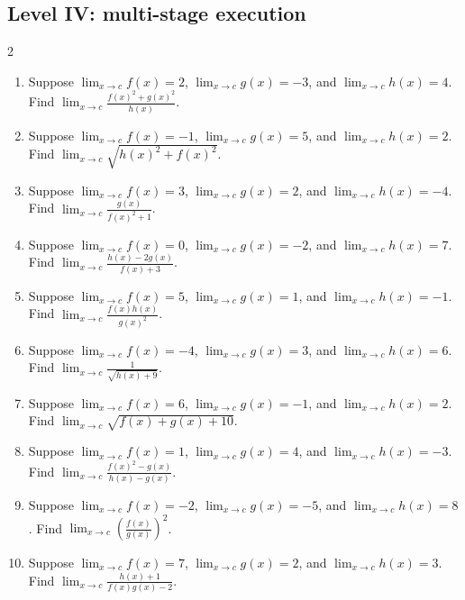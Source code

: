 \documentclass[11pt,oneside]{book}
\begin{document}
\subsection*{Level IV: multi-stage execution}
\begin{multicols}{2}
\begin{enumerate}[leftmargin=*,label=\textbf{\arabic*.},itemsep=0.65\baselineskip]
\item Suppose $\lim_{x\to c} f(x)=2$, $\lim_{x\to c} g(x)=-3$, and $\lim_{x\to c} h(x)=4$. Find $\displaystyle\lim_{x\to c} \frac{f(x)^2+g(x)^2}{h(x)}$.
\item Suppose $\lim_{x\to c} f(x)=-1$, $\lim_{x\to c} g(x)=5$, and $\lim_{x\to c} h(x)=2$. Find $\displaystyle\lim_{x\to c} \sqrt{h(x)^2+f(x)^2}$.
\item Suppose $\lim_{x\to c} f(x)=3$, $\lim_{x\to c} g(x)=2$, and $\lim_{x\to c} h(x)=-4$. Find $\displaystyle\lim_{x\to c} \frac{g(x)}{f(x)^2+1}$.
\item Suppose $\lim_{x\to c} f(x)=0$, $\lim_{x\to c} g(x)=-2$, and $\lim_{x\to c} h(x)=7$. Find $\displaystyle\lim_{x\to c} \frac{h(x)-2g(x)}{f(x)+3}$.
\item Suppose $\lim_{x\to c} f(x)=5$, $\lim_{x\to c} g(x)=1$, and $\lim_{x\to c} h(x)=-1$. Find $\displaystyle\lim_{x\to c} \frac{f(x)h(x)}{g(x)^2}$.
\item Suppose $\lim_{x\to c} f(x)=-4$, $\lim_{x\to c} g(x)=3$, and $\lim_{x\to c} h(x)=6$. Find $\displaystyle\lim_{x\to c} \frac{1}{\sqrt{h(x)+9}}$.
\item Suppose $\lim_{x\to c} f(x)=6$, $\lim_{x\to c} g(x)=-1$, and $\lim_{x\to c} h(x)=2$. Find $\displaystyle\lim_{x\to c} \sqrt{f(x)+g(x)+10}$.
\item Suppose $\lim_{x\to c} f(x)=1$, $\lim_{x\to c} g(x)=4$, and $\lim_{x\to c} h(x)=-3$. Find $\displaystyle\lim_{x\to c} \frac{f(x)^2-g(x)}{h(x)-g(x)}$.
\item Suppose $\lim_{x\to c} f(x)=-2$, $\lim_{x\to c} g(x)=-5$, and $\lim_{x\to c} h(x)=8$. Find $\displaystyle\lim_{x\to c} \left(\frac{f(x)}{g(x)}\right)^2$.
\item Suppose $\lim_{x\to c} f(x)=7$, $\lim_{x\to c} g(x)=2$, and $\lim_{x\to c} h(x)=3$. Find $\displaystyle\lim_{x\to c} \frac{h(x)+1}{f(x)g(x)-2}$.
\end{enumerate}
\end{multicols}
\end{document}
